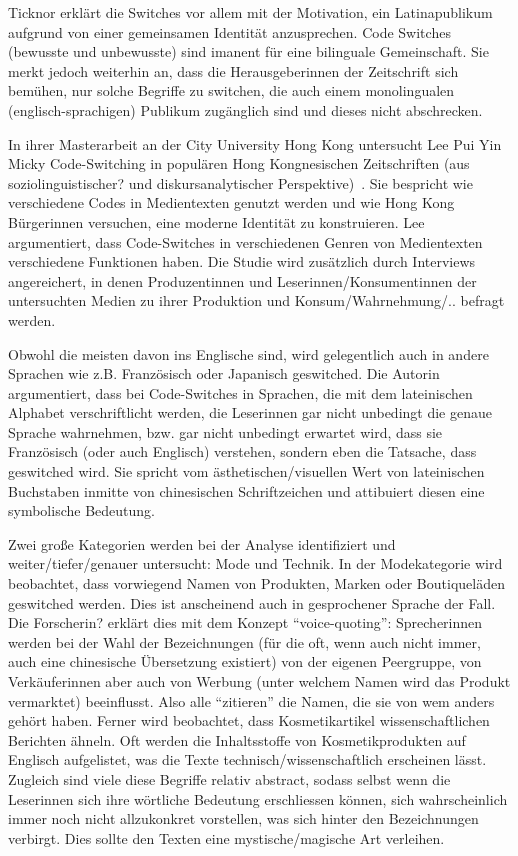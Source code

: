 Ticknor erklärt die Switches vor allem mit der Motivation, ein Latinapublikum aufgrund von einer gemeinsamen Identität anzusprechen.
Code Switches (bewusste und unbewusste) sind imanent für eine bilinguale Gemeinschaft.
Sie merkt jedoch weiterhin an, dass die Herausgeberinnen der Zeitschrift sich bemühen, nur solche Begriffe zu switchen, die auch einem monolingualen (englisch-sprachigen) Publikum zugänglich sind und dieses nicht abschrecken.



In ihrer Masterarbeit an der City University Hong Kong untersucht Lee Pui Yin Micky Code-Switching in populären Hong Kongnesischen Zeitschriften (aus soziolinguistischer? und diskursanalytischer Perspektive)~\cite[]{Lee99}.
Sie bespricht wie verschiedene Codes in Medientexten genutzt werden und wie Hong Kong Bürgerinnen versuchen, eine moderne Identität zu konstruieren.
Lee argumentiert, dass Code-Switches in verschiedenen Genren von Medientexten verschiedene Funktionen haben.
Die Studie wird zusätzlich durch Interviews angereichert, in denen Produzentinnen und Leserinnen/Konsumentinnen der untersuchten Medien zu ihrer Produktion und Konsum/Wahrnehmung/.. befragt werden.

Obwohl die meisten davon ins Englische sind, wird gelegentlich auch in andere Sprachen wie z.B. Französisch oder Japanisch geswitched.
Die Autorin argumentiert, dass bei Code-Switches in Sprachen, die mit dem lateinischen Alphabet verschriftlicht werden, die Leserinnen gar nicht unbedingt die genaue Sprache wahrnehmen, bzw. gar nicht unbedingt erwartet wird, dass sie Französisch (oder auch Englisch) verstehen, sondern eben die Tatsache, dass geswitched wird.
Sie spricht vom ästhetischen/visuellen Wert von lateinischen Buchstaben inmitte von chinesischen Schriftzeichen und attibuiert diesen eine symbolische Bedeutung.

Zwei große Kategorien werden bei der Analyse identifiziert und weiter/tiefer/genauer untersucht: Mode und Technik.
In der Modekategorie wird beobachtet, dass vorwiegend Namen von Produkten, Marken oder Boutiqueläden geswitched werden.
Dies ist anscheinend auch in gesprochener Sprache der Fall.
Die Forscherin? erklärt dies mit dem Konzept ``voice-quoting'': Sprecherinnen werden bei der Wahl der Bezeichnungen (für die oft, wenn auch nicht immer, auch eine chinesische Übersetzung existiert) von der eigenen Peergruppe, von Verkäuferinnen aber auch von Werbung (unter welchem Namen wird das Produkt vermarktet) beeinflusst.
Also alle ``zitieren'' die Namen, die sie von wem anders gehört haben.
Ferner wird beobachtet, dass Kosmetikartikel wissenschaftlichen Berichten ähneln.
Oft werden die Inhaltsstoffe von Kosmetikprodukten auf Englisch aufgelistet, was die Texte technisch/wissenschaftlich erscheinen lässt.
Zugleich sind viele diese Begriffe relativ abstract, sodass selbst wenn die Leserinnen sich ihre wörtliche Bedeutung erschliessen können, sich wahrscheinlich immer noch nicht allzukonkret vorstellen, was sich hinter den Bezeichnungen verbirgt.
Dies sollte den Texten eine mystische/magische Art verleihen.

